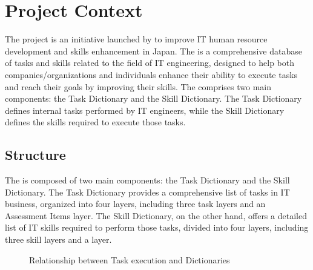 
\section{Project Context}
The  project is an initiative launched by  to improve IT human resource development and skills enhancement in Japan. The  is a comprehensive database of tasks and skills related to the field of IT engineering, designed to help both companies/organizations and individuals enhance their ability to execute tasks and reach their goals by improving their skills. The  comprises two main components: the Task Dictionary and the Skill Dictionary. The Task Dictionary defines internal tasks performed by IT engineers, while the Skill Dictionary defines the skills required to execute those tasks.

\newpage
\subsection{ Structure}
The  is composed of two main components: the Task Dictionary and the Skill Dictionary. The Task Dictionary provides a comprehensive list of tasks in IT business, organized into four layers, including three task layers and an Assessment Items layer. The Skill Dictionary, on the other hand, offers a detailed list of IT skills required to perform those tasks, divided into four layers, including three skill layers and a  layer.

\begin{figure}[H]
    \centering
    \caption{ Relationship between Task execution and Dictionaries}
    \label{fig:task_dictionaries_Relationship}
\end{figure}

